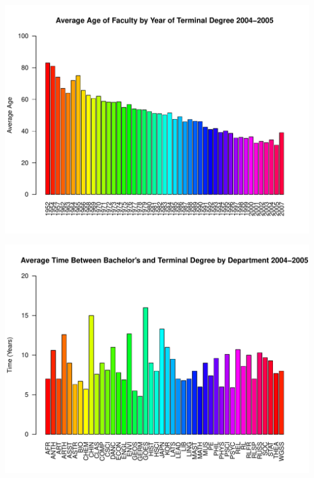\documentclass[12pt,a4paper]{article}\usepackage[]{graphicx}\usepackage[]{color}
\makeatletter
\def\maxwidth{ %
  \ifdim\Gin@nat@width>\linewidth
    \linewidth
  \else
    \Gin@nat@width
  \fi
}
\newenvironment{knitrout}{}{} %
\theoremstyle{definition}
\makeatother
\begin{document}
\begin{knitrout}
\color{fgcolor}
\includegraphics[width=\maxwidth]{figure/unnamed-chunk-12-1} 

\end{knitrout}

\begin{knitrout}
\color{fgcolor}
\includegraphics[width=\maxwidth]{figure/unnamed-chunk-13-1} 

\end{knitrout}
\end{document}
